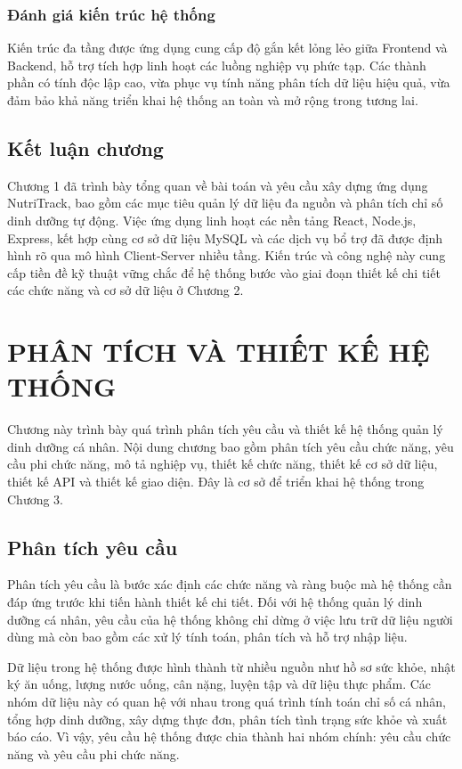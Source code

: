 \documentclass[12pt, a4paper]{report}
\begin{document}
\subsection{Đánh giá kiến trúc hệ thống}
Kiến trúc đa tầng được ứng dụng cung cấp độ gắn kết lỏng lẻo giữa Frontend và Backend, hỗ trợ tích hợp linh hoạt các luồng nghiệp vụ phức tạp. Các thành phần có tính độc lập cao, vừa phục vụ tính năng phân tích dữ liệu hiệu quả, vừa đảm bảo khả năng triển khai hệ thống an toàn và mở rộng trong tương lai.

\section{Kết luận chương}
Chương 1 đã trình bày tổng quan về bài toán và yêu cầu xây dựng ứng dụng NutriTrack, bao gồm các mục tiêu quản lý dữ liệu đa nguồn và phân tích chỉ số dinh dưỡng tự động. Việc ứng dụng linh hoạt các nền tảng React, Node.js, Express, kết hợp cùng cơ sở dữ liệu MySQL và các dịch vụ bổ trợ đã được định hình rõ qua mô hình Client-Server nhiều tầng. Kiến trúc và công nghệ này cung cấp tiền đề kỹ thuật vững chắc để hệ thống bước vào giai đoạn thiết kế chi tiết các chức năng và cơ sở dữ liệu ở Chương 2.

\chapter{PHÂN TÍCH VÀ THIẾT KẾ HỆ THỐNG}
Chương này trình bày quá trình phân tích yêu cầu và thiết kế hệ thống quản lý dinh dưỡng cá nhân. Nội dung chương bao gồm phân tích yêu cầu chức năng, yêu cầu phi chức năng, mô tả nghiệp vụ, thiết kế chức năng, thiết kế cơ sở dữ liệu, thiết kế API và thiết kế giao diện. Đây là cơ sở để triển khai hệ thống trong Chương 3.

\section{Phân tích yêu cầu}Phân tích yêu cầu là bước xác định các chức năng và ràng buộc mà hệ thống cần đáp ứng trước khi tiến hành thiết kế chi tiết. Đối với hệ thống quản lý dinh dưỡng cá nhân, yêu cầu của hệ thống không chỉ dừng ở việc lưu trữ dữ liệu người dùng mà còn bao gồm các xử lý tính toán, phân tích và hỗ trợ nhập liệu.

Dữ liệu trong hệ thống được hình thành từ nhiều nguồn như hồ sơ sức khỏe, nhật ký ăn uống, lượng nước uống, cân nặng, luyện tập và dữ liệu thực phẩm. Các nhóm dữ liệu này có quan hệ với nhau trong quá trình tính toán chỉ số cá nhân, tổng hợp dinh dưỡng, xây dựng thực đơn, phân tích tình trạng sức khỏe và xuất báo cáo. Vì vậy, yêu cầu hệ thống được chia thành hai nhóm chính: yêu cầu chức năng và yêu cầu phi chức năng.
\end{document}
